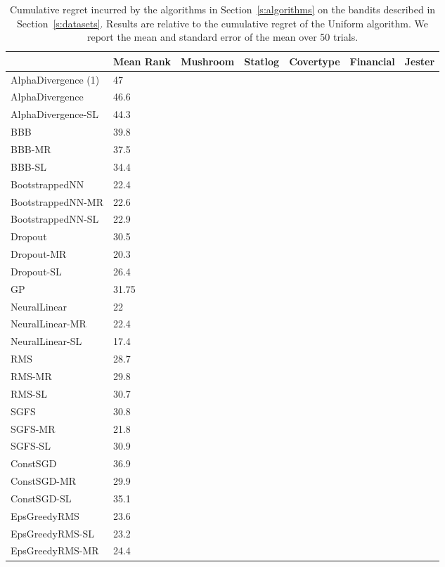\documentclass{article} \usepackage{iclr2018_conference,times}
\begin{document}
\begin{table}[ht]
  \caption{Cumulative regret incurred by the algorithms in Section~\ref{s:algorithms} on the bandits described in Section~\ref{s:datasets}. Results are relative to the cumulative regret of the Uniform algorithm. We report the mean and standard error of the mean over 50 trials.}
  \label{tab:nonlinear_cum_regret_main}
  \centering
  \footnotesize
  \tiny
  \begin{tabular}{lllllll}
& Mean Rank & Mushroom & Statlog & Covertype & Financial & Jester \\
\midrule
AlphaDivergence (1) & 47& & & & &  \\
AlphaDivergence & 46.6& & & & &  \\
AlphaDivergence-SL & 44.3& & & & &  \\
BBB & 39.8& & & & &  \\
BBB-MR & 37.5& & & & &  \\
BBB-SL & 34.4& & & & &  \\
BootstrappedNN & 22.4& & & & &  \\
BootstrappedNN-MR & 22.6& & & & &  \\
BootstrappedNN-SL & 22.9& & & & &  \\
Dropout & 30.5& & & & &  \\
Dropout-MR & 20.3& & & & &  \\
Dropout-SL & 26.4& & & & &  \\
GP & 31.75& & & & &  \\
NeuralLinear & 22& & & & &  \\
NeuralLinear-MR & 22.4& \bm{}& & & &  \\
NeuralLinear-SL & 17.4& & \bm{}& & &  \\
RMS & 28.7& & & & &  \\
RMS-MR & 29.8& & & & &  \\
RMS-SL & 30.7& & & & &  \\
SGFS & 30.8& & & & &  \\
SGFS-MR & 21.8& & & & &  \\
SGFS-SL & 30.9& & & & &  \\
ConstSGD & 36.9& & & \bm{}& &  \\
ConstSGD-MR & 29.9& & & & &  \\
ConstSGD-SL & 35.1& & & \bm{}& &  \\
EpsGreedyRMS & 23.6& & & & &  \\
EpsGreedyRMS-SL & 23.2& & & & &  \\
EpsGreedyRMS-MR & 24.4& & & & &  \\

\end{tabular}
\end{table}
\end{document}
